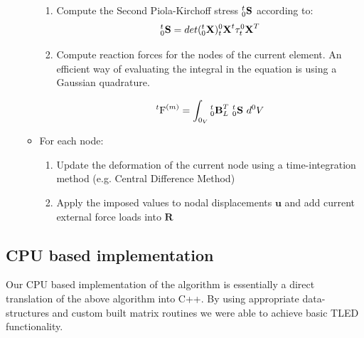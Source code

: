 \begin{enumerate}
\begin{itemize}
\begin{enumerate}
      \item Compute the Second Piola-Kirchoff stress $_{0}^{t}\textrm{\textbf{S}}$ according to:
        \begin{equation}
        \label{eq-spk}
        _{0}^{t}\textrm{\textbf{S}} =
          det(_{0}^{t}\textrm{\textbf{X}})
            _{t}^{0}\textrm{\textbf{X}}^{t} \tau _{t}^{0}\textrm{\textbf{X}}^{T}
        \end{equation}

      \item Compute reaction forces for the nodes of the current element. An efficient way of evaluating the integral in the equation is using a Gaussian quadrature.

      \begin{equation}
      \label{eq-reaction-forces}
      ^{t}\textrm{F}^{(m)} =
      \int_{0_{V}}{_{0}^{t}\textrm{\textbf{B}}_{L}^{T}
        \textrm{ }
        _{0}^{t}\textrm{\textbf{S}}
        \textrm{ }
        d^{0}V}
      \end{equation}
    \end{enumerate}

    \item For each node:

    \begin{enumerate}

      \item Update the deformation of the current node using a time-integration method (e.g. Central Difference Method)

      \item \label{fea-algorithm-external-loads} Apply the imposed values to nodal displacements $\textbf{u}$ and add current external force loads into $\textbf{R}$

    \end{enumerate}

  \end{itemize}

\end{enumerate}


\subsection{CPU based implementation}

  Our CPU based implementation of the algorithm is essentially a direct translation of the above algorithm into C++. By using appropriate data-structures and custom built matrix routines we were able to achieve basic TLED functionality.

